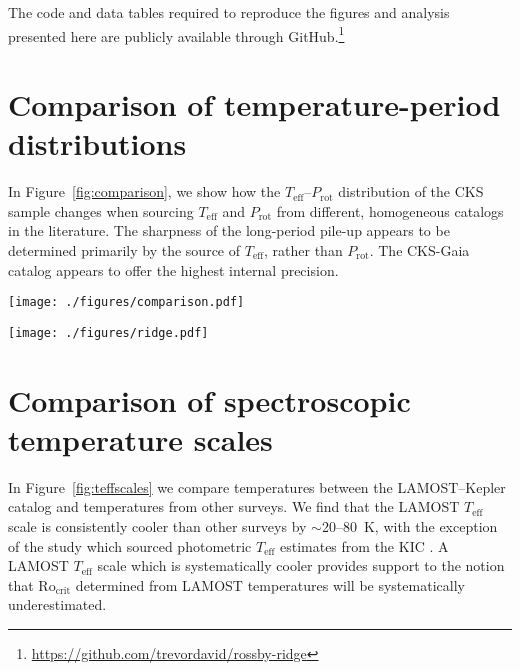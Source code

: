 \documentclass[linenumbers,tighten,trackchanges,twocolumn]{aastex631}
\newcommand{\rocrit}{$\mathrm{Ro_{crit}}$\xspace}
\newcommand{\teff}{\ensuremath{T_{\mathrm{eff}}}\xspace}
\newcommand{\prot}{\ensuremath{P_\mathrm{rot}}\xspace}
\begin{document}
The code and data tables required to reproduce the figures and analysis presented here are publicly available through GitHub.\footnote{\url{https://github.com/trevordavid/rossby-ridge}}


\appendix
\section{Comparison of temperature-period distributions}\label{app:teffprot}
In Figure~\ref{fig:comparison}, we show how the \teff--\prot distribution of the CKS sample changes when sourcing \teff and \prot from different, homogeneous catalogs in the literature. The sharpness of the long-period pile-up appears to be determined primarily by the source of \teff, rather than \prot. The CKS-Gaia catalog \citep{Fulton2018} appears to offer the highest internal precision.  


\begin{figure*}
    \centering
    \texttt{[image: ./figures/comparison.pdf]}
    \caption{Comparison of the \teff--\prot distribution for the CKS sample using rotation periods and \teff from the sources indicated by the axes labels.}
    \label{fig:comparison}
\end{figure*}

\begin{figure*}
    \centering
    \texttt{[image: ./figures/ridge.pdf]}
    \caption{The \teff-\prot plane for the CKS sample. Point colors are scaled to the CKS ages determined from isochrone fitting. The source of \prot is denoted above each panel, where \citet{David2021} is a compilation of vetted periods, rather than a source of original measurements. The black trapezoid indicates the approximate area of the ridge. The grey curves indicate empirical cluster sequences from \citet{Curtis2020}, corresponding to ages of $\sim$2.7, 1, 0.67, and 0.12~Gyr from top to bottom.}
    \label{fig:ridge}
\end{figure*}


\section{Comparison of spectroscopic temperature scales}\label{app:teff}

In Figure~\ref{fig:teffscales} we compare temperatures between the LAMOST--Kepler catalog and temperatures from other surveys. We find that the LAMOST \teff scale is consistently cooler than other surveys by $\sim$20--80~K, with the exception of the \citet{McQuillan2014} study which sourced photometric \teff estimates from the KIC \citep{Brown2011}. A LAMOST \teff scale which is systematically cooler provides support to the notion that \rocrit determined from LAMOST temperatures will be systematically underestimated. 
\end{document}
